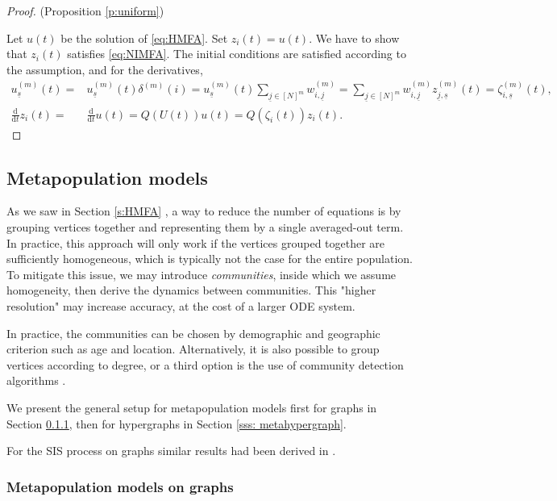 \documentclass{article}
\renewcommand{\d}{\mathrm{d}}
\newcommand{\1}[1]{{\mathds{1}}_{\left\{#1\right\}}}
\newcommand{\rem}[1]{{#1}}
\begin{document}
	\begin{proof}(Proposition \ref{p:uniform})
		
		Let $u(t)$ be the solution of \eqref{eq:HMFA}. Set $z_{i}(t)=u(t).$ We have to show that $z_i(t)$ satisfies \eqref{eq:NIMFA}. The initial conditions are satisfied according to the assumption, and for the derivatives,
		\begin{align*}
			u_{\underline{s}}^{(m)}(t)=&u_{\underline{s}}^{(m)}(t)  \delta^{(m)}(i)=u_{\underline{s}}^{(m)}(t) \sum_{\underline{j} \in [N]^m} w_{i,\underline{j}}^{(m)}=\sum_{\underline{j} \in [N]^m} w_{i,\underline{j}}^{(m)}z_{\underline{j},\underline{s}}^{(m)}(t)=\zeta_{i,\underline{s}}^{(m)}(t),\\
			\frac{\d}{\d t}z_{i}(t)=&\frac{\d }{\d t} u(t)=Q \left(U(t) \right)u(t)=Q \left(\zeta_{i}(t)\right)z_{i}(t).
		\end{align*}
	\end{proof}
	
	\subsection{Metapopulation models}
	\label{s:meta}
	
	As we saw in Section \ref{s:HMFA} \rem{,} a way to reduce the number of equations is by grouping vertices together and representing them by a single averaged-out term. In practice, this approach will only work if the vertices grouped together are sufficiently homogeneous, which is typically not the case for the entire population. To mitigate this issue, we may introduce \emph{communities}, inside which we assume homogeneity, then derive the dynamics between communities. This "higher resolution" may increase accuracy, at the cost of a larger ODE system. 
	
	In practice, the communities can be chosen by demographic and geographic criterion such as age and location. Alternatively, it is also possible to group vertices according to degree, or a third option is the use of community detection algorithms \cite{SzemerediAlgorithm}.
	
	We present the general setup for metapopulation models first for graphs in Section \ref{sss: metagraph}, then for hypergraphs in Section \ref{sss: metahypergraph}\rem{.}
	
	For the SIS process on graphs similar results had been derived in \cite{SISpartition}.
	\subsubsection{Metapopulation models on graphs}
	\label{sss: metagraph}
	
\end{document}
